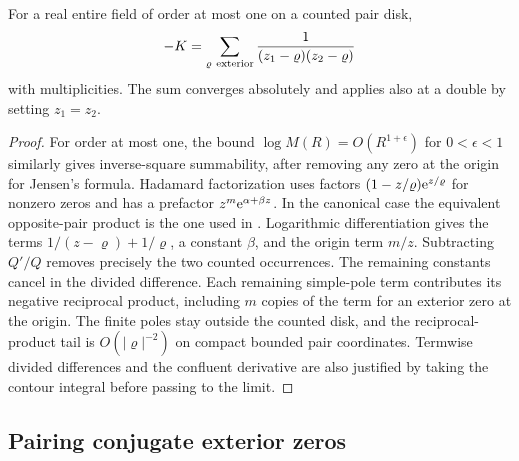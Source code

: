 \begin{proposition}
\label{gt-exterior-proposition}
For a real entire field of order at most one on a counted pair disk,
\begin{equation}
 -K=\sum_{\varrho\ {\rm exterior}}
       \frac{1}{(z_1-\varrho)(z_2-\varrho)}
 \label{gt-exterior-k}
\end{equation}
with multiplicities. The sum converges absolutely and applies also at
a double by setting \(z_1=z_2\).
\end{proposition}
\begin{proof}
For order at most one, the bound \(\log M(R)=O(R^{1+\epsilon})\)
for \(0<\epsilon<1\) similarly gives inverse-square summability,
after removing any zero at the origin for Jensen's formula.
Hadamard factorization uses factors
\((1-z/\varrho)\mathrm e^{z/\varrho}\) for nonzero zeros and has a
prefactor \(z^m\mathrm e^{\alpha+\beta z}\).
In the canonical case the equivalent opposite-pair product is the
one used in \cite[proof of Proposition~3.1(i)]{polymath}. Logarithmic
differentiation gives the terms \(1/(z-\varrho)+1/\varrho\), a
constant \(\beta\), and the origin term \(m/z\). Subtracting \(Q'/Q\)
removes precisely the two counted occurrences. The remaining
constants cancel in the divided difference. Each remaining simple-pole
term contributes its negative reciprocal product, including \(m\)
copies of the term for an exterior zero at the origin. The finite
poles stay outside the counted disk, and the reciprocal-product tail
is \(O(|\varrho|^{-2})\) on compact bounded pair coordinates.
Termwise divided differences and the confluent derivative are also
justified by taking the contour integral before passing to the limit.
\end{proof}

\subsection{Pairing conjugate exterior zeros}

